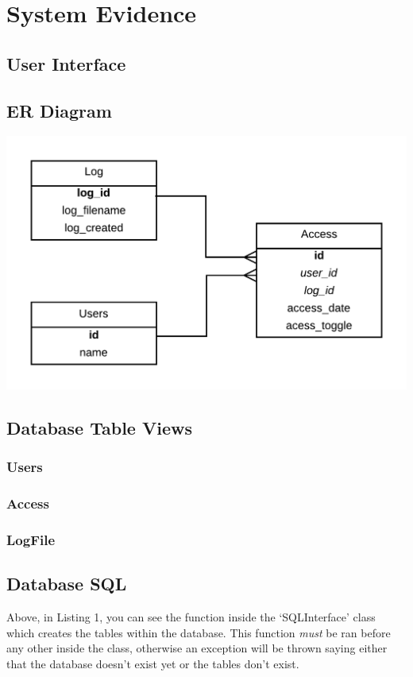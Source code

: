 \documentclass[a4paper]{article}
\begin{document}
\section{System Evidence}
\subsection{User Interface}
\subsection{ER Diagram}
\begin{center}
\includegraphics[scale=0.3]{../shared_assets/diagrams/ERD.png}
\end{center}

\subsection{Database Table Views}
\subsubsection{Users}
\subsubsection{Access}
\subsubsection{LogFile}

\subsection{Database SQL}


Above, in Listing 1, you can see the function inside the `SQLInterface' class which creates the tables
within the database. This function \textit{must} be ran before any other inside the class, otherwise
an exception will be thrown saying either that the database doesn't exist yet or the tables don't exist.
\end{document}
